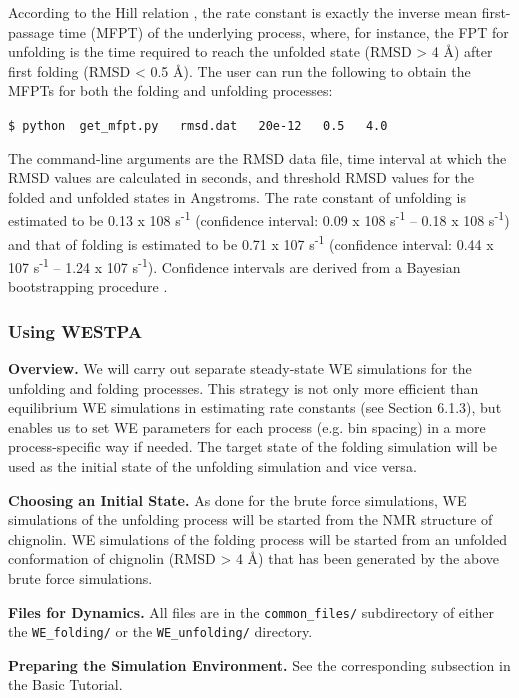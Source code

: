 \documentclass[9pt,tutorial,pubversion]{livecoms}
\begin{document}
According to the Hill relation \citep{Hill1989}, the rate constant is exactly the inverse mean first-passage time (MFPT) of the underlying process, where, for instance, the FPT for unfolding is the time required to reach the unfolded state (RMSD > 4 \AA) after first folding (RMSD < 0.5 \AA). 
The user can run the following to obtain the MFPTs for both the folding and unfolding processes: 

\verb|$ python  get_mfpt.py   rmsd.dat   20e-12   0.5   4.0|

The command-line arguments are the RMSD data file, time interval at which the RMSD values are calculated in seconds, and threshold RMSD values for the folded and unfolded states in Angstroms. 
The rate constant of unfolding is estimated to be 0.13 x 108 s\textsuperscript{-1} (confidence interval: 0.09 x 108 s\textsuperscript{-1} – 0.18 x 108 s\textsuperscript{-1}) and that of folding is estimated to be 0.71 x 107 s\textsuperscript{-1} (confidence interval: 0.44 x 107 s\textsuperscript{-1} – 1.24 x 107 s\textsuperscript{-1}). 
Confidence intervals are derived from a Bayesian bootstrapping procedure \citep{Mostofian2019}. 

\subsubsection{Using WESTPA}

\textbf{Overview.} We will carry out separate steady-state WE simulations for the unfolding and folding processes. 
This strategy is not only more efficient than equilibrium WE simulations in estimating rate constants (see Section 6.1.3), but enables us to set WE parameters for each process (e.g. bin spacing) in a more process-specific way if needed. 
The target state of the folding simulation will be used as the initial state of the unfolding simulation and vice versa. 

\textbf{Choosing an Initial State.} As done for the brute force simulations, WE simulations of the unfolding process will be started from the NMR structure of chignolin. 
WE simulations of the folding process will be started from an unfolded conformation of chignolin (RMSD > 4 \AA) that has been generated by the above brute force simulations.
 
\textbf{Files for Dynamics.} All files are in the \verb|common_files/| subdirectory of either the \verb|WE_folding/| or the \verb|WE_unfolding/| directory.
 
\textbf{Preparing the Simulation Environment.} See the corresponding subsection in the Basic Tutorial.
 
\end{document}
